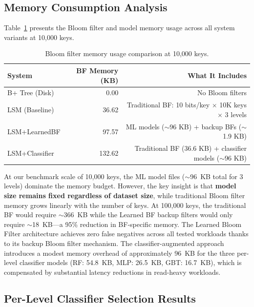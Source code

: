 \documentclass{mnitjaipur}
\begin{document}
\subsection{Memory Consumption Analysis}

Table~\ref{tab:memory-analysis} presents the Bloom filter and model memory usage across all system variants at 10,000 keys.

\begin{table}[h]
    \centering
    \begin{tabular}{lrr}
        \toprule
        \textbf{System} & \textbf{BF Memory (KB)} & \textbf{What It Includes} \\
        \midrule
        B+ Tree (Disk)      & 0.00   & No Bloom filters \\
        LSM (Baseline)      & 36.62  & Traditional BF: 10 bits/key $\times$ 10K keys $\times$ 3 levels \\
        LSM+LearnedBF       & 97.57  & ML models ($\sim$96 KB) + backup BFs ($\sim$1.9 KB) \\
        LSM+Classifier      & 132.62 & Traditional BF (36.6 KB) + classifier models ($\sim$96 KB) \\
        \bottomrule
    \end{tabular}
    \caption{Bloom filter memory usage comparison at 10,000 keys.}
    \label{tab:memory-analysis}
\end{table}

At our benchmark scale of 10,000 keys, the ML model files ($\sim$96~KB total for 3 levels) dominate the memory budget. However, the key insight is that \textbf{model size remains fixed regardless of dataset size}, while traditional Bloom filter memory grows linearly with the number of keys. At 100,000 keys, the traditional BF would require $\sim$366~KB while the Learned BF backup filters would only require $\sim$18~KB---a 95\% reduction in BF-specific memory. The Learned Bloom Filter architecture achieves zero false negatives across all tested workloads thanks to its backup Bloom filter mechanism. The classifier-augmented approach introduces a modest memory overhead of approximately 96~KB for the three per-level classifier models (RF: 54.8~KB, MLP: 26.5~KB, GBT: 16.7~KB), which is compensated by substantial latency reductions in read-heavy workloads.

\subsection{Per-Level Classifier Selection Results}
\end{document}
